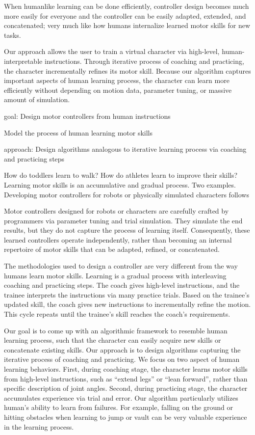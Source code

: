 When humanlike learning can be done efficiently, controller design
becomes much more easily for everyone and the controller can be easily
adapted, extended, and concatenated; very much like how humans
internalize learned motor skills for new tasks.

Our approach allows the user to train a virtual character via
high-level, human-interpretable instructions. Through iterative
process of coaching and practicing, the character incrementally refines
its motor skill. Because our algorithm captures important aspects
of human learning process, the character can learn more efficiently
without depending on motion data, parameter tuning, or massive amount
of simulation.



goal:
Design motor controllers from human instructions

Model the process of human learning motor skills

approach: 
Design algorithms analogous to iterative learning process via coaching
and practicing steps

How do toddlers learn to walk?
How do athletes learn to improve their skills?
Learning motor skills is an accumulative and gradual process. Two
examples. Developing motor controllers for robots or physically
simulated characters follows 

Motor controllers designed for robots or characters are carefully crafted by programmers via parameter tuning and trial simulation. They simulate the end results, but they do not capture the process of learning itself.
Consequently, these learned controllers operate independently, rather than becoming an internal repertoire of motor skills that can be adapted, refined, or concatenated. 

The methodologies used to design a controller are very different from the way humans learn motor skills.
Learning is a gradual process with interleaving coaching and practicing steps. The coach gives high-level instructions, and the trainee interprets the instructions via many practice trials. Based on the trainee's updated skill, the coach gives new instructions to incrementally refine the motion. This cycle repeats until the trainee's skill reaches the coach's requirements.

Our goal is to come up with an algorithmic framework to resemble human
learning process, such that the character can easily acquire new
skills or concatenate existing skills. Our approach is to design
algorithms capturing the iterative process of coaching and
practicing. We focus on two aspect of human learning behaviors. First,
during coaching stage, the character learns motor skills from
high-level instructions, such as ``extend legs'' or ``lean forward'',
rather than specific description of joint angles. Second, during
practicing stage, the character accumulates experience via trial and
error. Our algorithm particularly utilizes human's ability to learn
from failures. For example, falling on the ground or hitting obstacles
when learning to jump or vault can be very valuable experience in the
learning process.


